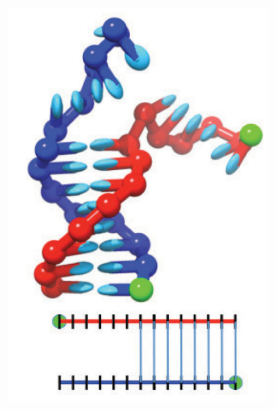 \begin{figure}[ht]
\begin{centering}
\begin{subfigure}[t]{\dimexpr.15\linewidth-1.3em\relax}
  \includegraphics[width=.98\linewidth,valign=t]{Figures/hybridDiag4.png}
  \end{subfigure}%
  \hspace{-0.38cm}
  \begin{subfigure}[t]{\dimexpr.15\linewidth-1.3em\relax}
  \centering

\end{subfigure}
\end{centering}
\end{figure}
